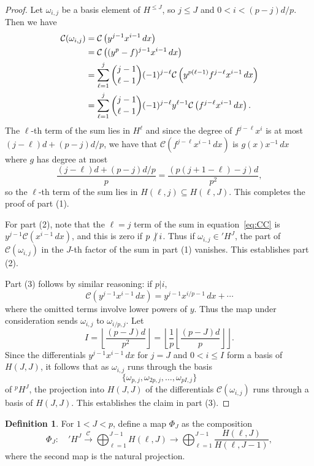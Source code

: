 \documentclass[12pt,reqno]{amsart}
\numberwithin{equation}{section}
\theoremstyle{plain}
\theoremstyle{definition}
\newtheorem{defn}[subsection]{Definition}
\theoremstyle{remark}
\numberwithin{equation}{section}
\newcommand{\CC}{\mathcal{C}}
\newcommand{\<}{\langle}
\renewcommand{\>}{\rangle}
\newcommand{\nodiv}{\not|}
\def\nodiv{\mathrel{\mathchoice{\not|}{\not|}{\kern-.2em\not\kern.2em|}
{\kern-.2em\not\kern.2em|}}}
\newcommand{\labeledlongto}[1]{\overset{#1}{\longrightarrow}}
\def\HlJ{H^{\le J}}
\def\prH{{}'H^J}
\def\pH{{}^pH^J}
\begin{document}
\begin{proof}
  Let $\omega_{i,j}$ be a basis element of $\HlJ$, so $j\le J$ and
  $0<i<(p-j)d/p$.   Then we have
  \begin{align}
    \CC(\omega_{i,j})&=\CC\left(y^{j-1}x^{i-1}\,dx\right)\notag\\
                     &=\CC\left((y^p-f)^{j-1}x^{i-1}\,dx\right)\notag\\
                     &=\sum_{\ell=1}^j\binom{j-1}{\ell-1}(-1)^{j-\ell}
                       \CC\left(y^{p(\ell-1)}f^{j-\ell}x^{i-1}\,dx\right)\notag\\
                     &=\sum_{\ell=1}^j\binom{j-1}{\ell-1}(-1)^{j-\ell}
                       y^{\ell-1}\CC\left(f^{j-\ell}x^{i-1}\,dx\right).\label{eq:CC}
  \end{align}
  The $\ell$-th term of the sum
  lies in $H^{\ell}$ and since the degree of $f^{j-\ell}x^{i}$ is at
  most $(j-\ell)d+(p-j)d/p$, we have that
  $\CC\left(f^{j-\ell}x^{i-1}\,dx\right)$ is $g(x)x^{-1}\,dx$ where
  $g$ has degree at most
\[\frac{(j-\ell)d+(p-j)d/p}{p}=\frac{(p(j+1-\ell)-j)d}{p^2},\]
so the $\ell$-th term of the sum
lies in $H(\ell,j)\subseteq H(\ell,J)$.  This completes the proof of
part (1).

For part (2), note that the $\ell=j$ term of the sum
in equation~\eqref{eq:CC} is $y^{j-1}\CC\left(x^{i-1}\,dx\right)$, and
this is zero if $p\nodiv i$.  Thus if $\omega_{i,j}\in \prH$, the part
of $\CC(\omega_{i,j})$ in the $J$-th factor of the sum in part (1)
vanishes.  This establishes part (2).

  Part (3) follows by similar reasoning:  if $p|i$,
  \[\CC\left(y^{j-1}x^{i-1}\,dx\right)=y^{j-1}x^{i/p-1}\,dx+\cdots\]
  where the omitted terms involve lower powers of $y$.  Thus the map
  under consideration sends $\omega_{i,j}$ to $\omega_{i/p,j}$.  Let
  \[I=\left\lfloor\frac{(p-J)d}{p^2}\right\rfloor
    =\left\lfloor\frac1p\left\lfloor\frac{(p-J)d}{p}\right\rfloor\right\rfloor.\]
  Since the differentials $y^{j-1}x^{i-1}\,dx$
  for $j=J$ and $0<i\le I$ form a basis of $H(J,J)$, it
  follows that as  $\omega_{i,j}$ runs through the basis 
  \[\{\omega_{p,j},\omega_{2p,j},\dots,\omega_{pI,j}\}\]
  of $\pH$, the projection into $H(J,J)$ of the differentials
  $\CC(\omega_{i,j})$ runs through a basis of $H(J,J)$. 
  This establishes the claim in part (3).
\end{proof}

\begin{defn}\label{def:Phi}
For $1< J<p$, define
a map $\Phi_J$ as the composition
\[
\Phi_J: \quad    \prH\labeledlongto{\CC}
\bigoplus_{\ell=1}^{J-1} H(\ell,J)
    \longrightarrow\bigoplus_{\ell=1}^{J-1}
    \frac{H(\ell,J)}{H(\ell,J-1)},
\]
where the second map is the natural projection.  
\end{defn}
\end{document}
